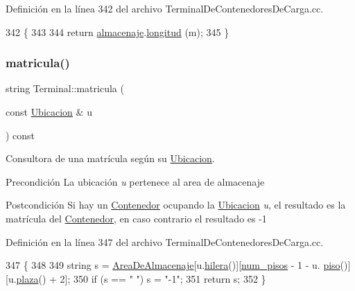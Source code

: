 Definición en la línea 342 del archivo Terminal\+De\+Contenedores\+De\+Carga.\+cc.


\begin{DoxyCode}
342                                              \{
343     
344     \textcolor{keywordflow}{return} \hyperlink{class_terminal_a1d87d7b16c4f460eee6f1ab73da90fd2}{almacenaje}.\hyperlink{class_almacenaje_a745cf4e181058d391aed220843d6cede}{longitud} (m);
345 \}
\end{DoxyCode}
\mbox{\label{class_terminal_a674811a7b56f57ff5b447d10565e923b}} 
\subsubsection{\texorpdfstring{matricula()}{matricula()}}
{\footnotesize\ttfamily string Terminal\+::matricula (\begin{DoxyParamCaption}\item[{const \hyperlink{class_ubicacion}{Ubicacion} \&}]{u }\end{DoxyParamCaption}) const}



Consultora de una matrícula según su \hyperlink{class_ubicacion}{Ubicacion}. 

\begin{DoxyPrecond}{Precondición}
La ubicación {\itshape u} pertenece al area de almacenaje 
\end{DoxyPrecond}
\begin{DoxyPostcond}{Postcondición}
Si hay un \hyperlink{class_contenedor}{Contenedor} ocupando la \hyperlink{class_ubicacion}{Ubicacion} {\itshape u}, el resultado es la matrícula del \hyperlink{class_contenedor}{Contenedor}, en caso contrario el resultado es -\/1 
\end{DoxyPostcond}


Definición en la línea 347 del archivo Terminal\+De\+Contenedores\+De\+Carga.\+cc.


\begin{DoxyCode}
347                                                     \{
348     
349     \textcolor{keywordtype}{string} s = \hyperlink{class_terminal_a50670862a5cdeb0504efd1c45b6416dc}{AreaDeAlmacenaje}[u.\hyperlink{class_ubicacion_abf00d08075e75ac833de7357ebc6f521}{hilera}()][\hyperlink{class_terminal_ad6cdee7fe26b4443d45b0a18c345a86d}{num\_pisos} - 1 - u.
      \hyperlink{class_ubicacion_af6099f8de4dee993e4c9119e1f879070}{piso}()][u.\hyperlink{class_ubicacion_abed323ffb2eace375e80bc395fdaeb39}{plaza}() + 2];
350     \textcolor{keywordflow}{if} (s == \textcolor{stringliteral}{" "}) s = \textcolor{stringliteral}{"-1"};
351     \textcolor{keywordflow}{return} s;
352 \}
\end{DoxyCode}
\mbox{\label{class_terminal_a6b2cb1486f78ef82f759fb071bb1049d}} 
